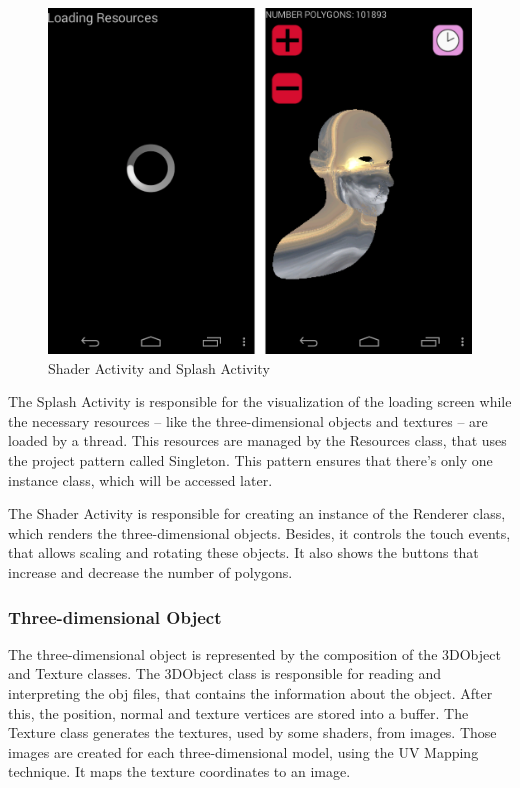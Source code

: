 \documentclass[10pt, conference, compsocconf]{IEEEtran}
\begin{document}
	\begin{figure}[!t]
	\centering
		\includegraphics[keepaspectratio=true,scale=0.12]{shader_splash.png}
	\caption{Shader Activity and Splash Activity}
	\label{shader_splash}
	\end{figure}
	
 The Splash Activity is responsible for the visualization of the loading screen
while the necessary resources -- like the three-dimensional objects and textures --
are loaded by a thread. This resources are managed by the Resources class, that
uses the project pattern called Singleton. This pattern ensures that there's
only one instance class, which will be accessed later. 

 The Shader Activity is responsible for creating an instance of the Renderer 
class, which renders the three-dimensional objects. Besides, it controls the
touch events, that allows scaling and rotating these objects. It also shows
the buttons that increase and decrease the number of polygons.  

\subsubsection{Three-dimensional Object}

The three-dimensional object is represented by the composition of the 3DObject and
Texture classes. The 3DObject class is responsible for reading and interpreting the
obj files, that contains the information about the object. After this, the position, 
normal and texture vertices are stored into a buffer. The Texture class generates the textures, used by some shaders, from images.
Those images are created for each three-dimensional model, using the UV Mapping 
technique. It maps the texture coordinates to an image.
\end{document}
